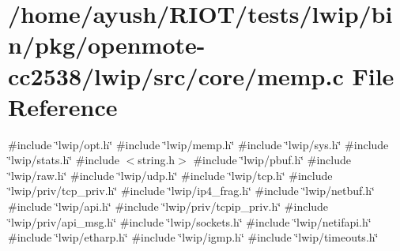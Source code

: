 \hypertarget{openmote-cc2538_2lwip_2src_2core_2memp_8c}{}\section{/home/ayush/\+R\+I\+O\+T/tests/lwip/bin/pkg/openmote-\/cc2538/lwip/src/core/memp.c File Reference}
\label{openmote-cc2538_2lwip_2src_2core_2memp_8c}
{\ttfamily \#include \char`\"{}lwip/opt.\+h\char`\"{}}\newline
{\ttfamily \#include \char`\"{}lwip/memp.\+h\char`\"{}}\newline
{\ttfamily \#include \char`\"{}lwip/sys.\+h\char`\"{}}\newline
{\ttfamily \#include \char`\"{}lwip/stats.\+h\char`\"{}}\newline
{\ttfamily \#include $<$string.\+h$>$}\newline
{\ttfamily \#include \char`\"{}lwip/pbuf.\+h\char`\"{}}\newline
{\ttfamily \#include \char`\"{}lwip/raw.\+h\char`\"{}}\newline
{\ttfamily \#include \char`\"{}lwip/udp.\+h\char`\"{}}\newline
{\ttfamily \#include \char`\"{}lwip/tcp.\+h\char`\"{}}\newline
{\ttfamily \#include \char`\"{}lwip/priv/tcp\+\_\+priv.\+h\char`\"{}}\newline
{\ttfamily \#include \char`\"{}lwip/ip4\+\_\+frag.\+h\char`\"{}}\newline
{\ttfamily \#include \char`\"{}lwip/netbuf.\+h\char`\"{}}\newline
{\ttfamily \#include \char`\"{}lwip/api.\+h\char`\"{}}\newline
{\ttfamily \#include \char`\"{}lwip/priv/tcpip\+\_\+priv.\+h\char`\"{}}\newline
{\ttfamily \#include \char`\"{}lwip/priv/api\+\_\+msg.\+h\char`\"{}}\newline
{\ttfamily \#include \char`\"{}lwip/sockets.\+h\char`\"{}}\newline
{\ttfamily \#include \char`\"{}lwip/netifapi.\+h\char`\"{}}\newline
{\ttfamily \#include \char`\"{}lwip/etharp.\+h\char`\"{}}\newline
{\ttfamily \#include \char`\"{}lwip/igmp.\+h\char`\"{}}\newline
{\ttfamily \#include \char`\"{}lwip/timeouts.\+h\char`\"{}}\newline
